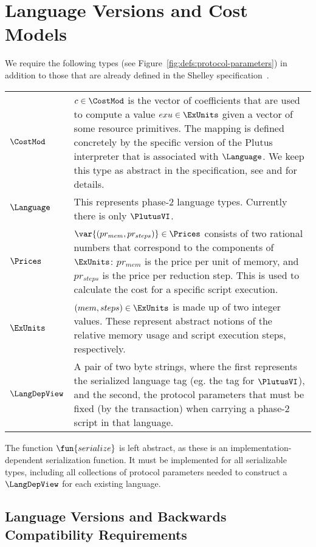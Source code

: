 \section{Language Versions and Cost Models}
\label{sec:protocol-parameters}

We require the following types (see Figure~\ref{fig:defs:protocol-parameters})
in addition to those that are already defined in the Shelley specification~\cite{shelley_spec}.

\vspace{12pt}
\begin{tabular}{lp{5in}}
  $\CostMod$ &
  $c\in\CostMod$ is the vector of coefficients that are used to compute
  a value $exu\in\ExUnits$ given a vector of some resource primitives. The mapping is defined
  concretely by the specific version of the Plutus interpreter that is associated with $\Language$.
  We keep this type as abstract in the specification, see \cite{plutuscore} and \cite{plutustech}
  for details.
  \\
  $\Language$ &
  This represents phase-2 language types. Currently there is only $\PlutusVI$.
  \\
  $\Prices$ &
  $\var{(pr_{mem}, pr_{steps})}\in \Prices$ consists of two rational numbers
  that correspond to the components of $\ExUnits$:
  $pr_{mem}$ is the price per unit of memory, and $pr_{steps}$ is the price per
  reduction step. This is used to calculate the cost for a specific script execution.
  \\
  $\ExUnits$ &
  $(mem, steps)\in \ExUnits$ is made up of two integer values.
  These represent abstract notions of the relative memory usage and script execution steps,
  respectively.
  \\
  $\LangDepView$ &
  A pair of two byte strings, where the first represents the serialized language tag (eg. the tag for $\PlutusVI$),
  and the second, the protocol parameters that must be fixed (by the transaction) when carrying a phase-2 script
  in that language.
\end{tabular}

The function $\fun{serialize}$ is left abstract, as
these is an implementation-dependent serialization function. It must
be implemented for all serializable types, including all
collections of protocol parameters needed to construct a $\LangDepView$ for
each existing language.

\subsection{Language Versions and Backwards Compatibility Requirements}
\label{sec:versions}

